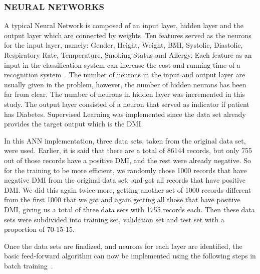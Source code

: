 \documentclass[journal]{./IEEE/IEEEtran}
\begin{document}
\subsubsection {NEURAL NETWORKS}

	A typical Neural Network is composed of an input layer, hidden layer and the output layer which are connected by weights. Ten features served as the neurons for the input layer, namely: Gender, Height, Weight, BMI, Systolic, Diastolic, Respiratory Rate, Temperature, Smoking Status and Allergy. Each feature as an input in the classification system can increase the cost and running time of a recognition system~\cite{Model13}. The number of neurons in the input and output layer are usually given in the problem, however, the number of hidden neurons has been far from clear. The number of neurons in hidden layer was incremented in this study. The output layer consisted of a neuron that served as indicator if patient has Diabetes. Supervised Learning was implemented since the data set already provides the target output which is the DMI.

	In this ANN implementation, three data sets, taken from the original data set, were used. Earlier, it is said that there are a total of 86144 records, but only 755 out of those records have a positive DMI, and the rest were already negative. So for the training to be more efficient, we randomly chose 1000 records that have negative DMI from the original data set, and get all records that have positive DMI. We did this again twice more, getting another set of 1000 records different from the first 1000 that we got and again getting all those that have positive DMI, giving us a total of three data sets with 1755 records each. Then these data sets were subdivided into training set, validation set and test set with a proportion of 70-15-15.

	Once the data sets are finalized, and neurons for each layer are identified, the basic feed-forward algorithm can now be implemented using the following steps in batch training~\cite{Parker06}.
\end{document}
